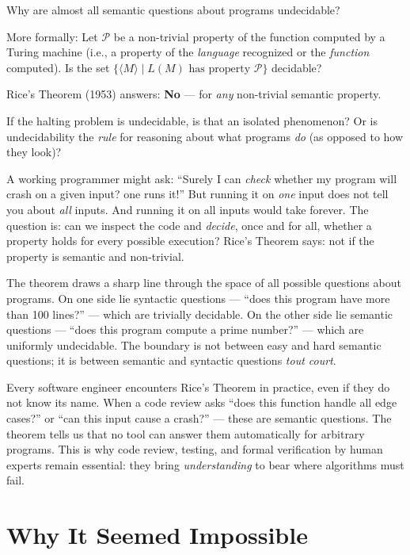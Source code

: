 Why are almost all semantic questions about programs undecidable?

More formally: Let $\mathcal{P}$ be a non-trivial property of the function computed by a Turing machine (i.e., a property of the \emph{language} recognized or the \emph{function} computed). Is the set $\{ \langle M \rangle \mid L(M) \text{ has property } \mathcal{P} \}$ decidable?

Rice's Theorem (1953) answers: \textbf{No} --- for \emph{any} non-trivial semantic property.

If the halting problem is undecidable, is that an isolated phenomenon? Or is undecidability the \emph{rule} for reasoning about what programs \emph{do} (as opposed to how they look)?

A working programmer might ask: ``Surely I can \emph{check} whether my program will crash on a given input? one runs it!'' But running it on \emph{one} input does not tell you about \emph{all} inputs. And running it on all inputs would take forever. The question is: can we inspect the code and \emph{decide}, once and for all, whether a property holds for every possible execution? Rice's Theorem says: not if the property is semantic and non-trivial.

The theorem draws a sharp line through the space of all possible questions about programs. On one side lie syntactic questions --- ``does this program have more than 100 lines?'' --- which are trivially decidable. On the other side lie semantic questions --- ``does this program compute a prime number?'' --- which are uniformly undecidable. The boundary is not between easy and hard semantic questions; it is between semantic and syntactic questions \emph{tout court}.

Every software engineer encounters Rice's Theorem in practice, even if they do not know its name. When a code review asks ``does this function handle all edge cases?'' or ``can this input cause a crash?'' --- these are semantic questions. The theorem tells us that no tool can answer them automatically for arbitrary programs. This is why code review, testing, and formal verification by human experts remain essential: they bring \emph{understanding} to bear where algorithms must fail.

\section{Why It Seemed Impossible}
\label{sec:rice:impossible}

